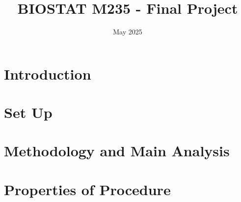 \documentclass[12pt]{article}
\title{BIOSTAT M235 - Final Project}
\author{}
\date{May 2025}
\begin{document}
\doublespacing

\maketitle

\section{Introduction}

\section{Set Up}

\section{Methodology and Main Analysis}

\section{Properties of Procedure}
\end{document}
